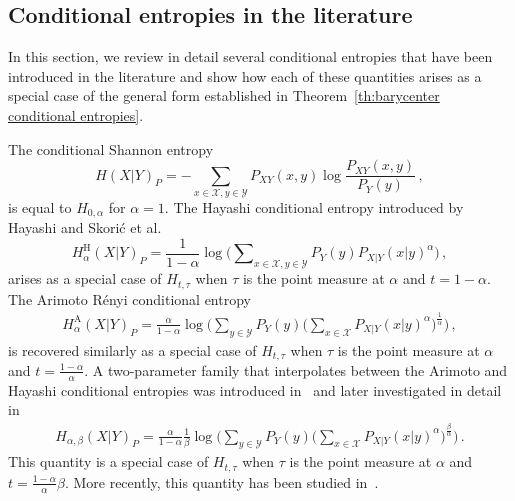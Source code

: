 \documentclass[aps,pra,11pt,onecolumn,nofootinbib,tightenlines]{revtex4-2}
\theoremstyle{definition}
\newcommand{\X}{\mathcal{X}}
\newcommand{\Y}{\mathcal{Y}}
\begin{document}
\bigskip


\subsection{Conditional entropies in the literature}
\label{sec: literature}
In this section, we review in detail several conditional entropies that have been introduced in the literature and show how each of these quantities arises as a special case of the general form established in Theorem~\ref{th:barycenter conditional entropies}.



The conditional Shannon entropy
\begin{equation}
    H(X|Y)_P=-\sum_{x \in \X,y\in\Y} P_{XY}(x,y)\log{\frac{P_{XY}(x,y)}{P_Y(y)}} \,,
\end{equation}
is equal to \(H_{0,\alpha}\) for \(\alpha = 1\).
The Hayashi conditional entropy introduced by Hayashi and Skorić et al.~\cite{hayashi2011exponential,vskoric2011sharp}
\begin{equation}
H^\text{H}_{\alpha}(X|Y)_P=\frac{1}{1-\alpha}\log{\Big(\sum\nolimits_{x\in\X,y\in\Y} P_Y(y) P_{X|Y}(x|y)^\alpha\Big)} \,,
\end{equation}
arises as a special case of $H_{t,\tau}$ when $\tau$ is the point measure at $\alpha$ and $t = 1 - \alpha$. The Arimoto Rényi conditional entropy~\cite{arimoto1977information} 
\begin{align}
H^\text{A}_{\alpha}(X|Y)_P=\frac{\alpha}{1-\alpha}\log{\bigg(\sum_{y\in \Y} P_Y(y)\Big(\sum_{x \in \X} P_{X|Y}(x|y)^\alpha\Big)^\frac{1}{\alpha}\bigg)} \,,
\end{align}
is recovered similarly as a special case of $H_{t,\tau}$ when $\tau$ is the point measure at $\alpha$ and $t = \frac{1 - \alpha}{\alpha}$. A two-parameter family that interpolates between the Arimoto and Hayashi conditional entropies was introduced in~\cite{hayashi2016equivocations} and later investigated in detail in~\cite{rubboli2024quantum}
\begin{align}
\label{eq: H alpha beta}
H_{\alpha,\beta}(X|Y)_P=\frac{\alpha}{1-\alpha}\frac{1}{\beta}\log{\bigg(\sum_{y \in \Y} P_Y(y)\Big(\sum_{x \in \X} P_{X|Y}(x|y)^\alpha\Big)^\frac{\beta} {\alpha}\bigg)} \,.
\end{align}
This quantity is a special case of $H_{t,\tau}$ when $\tau$ is the point measure at $\alpha$ and $t = \frac{1 - \alpha}{\alpha} \beta$. More recently, this quantity has been studied in~\cite{li2025two}.
\end{document}
